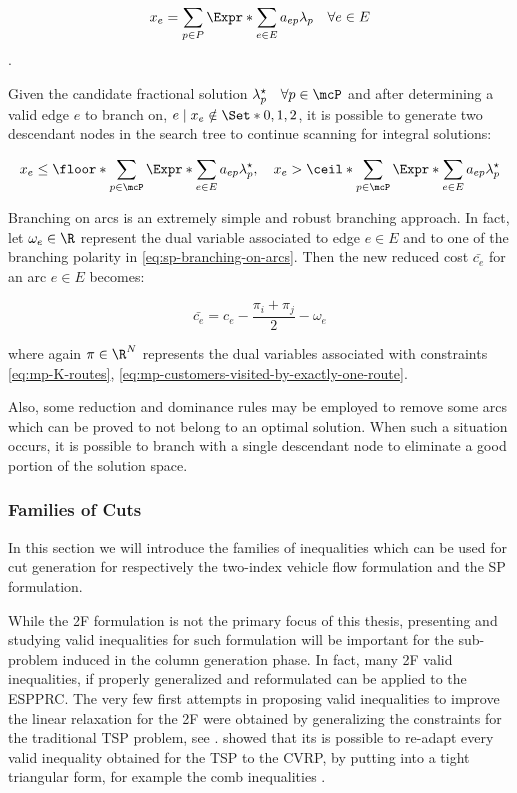 \begin{equation}
	x_e = \sum_{p \in P} \Expr*{\sum_{e \in E} a_{ep}} \lambda_p  \quad \forall e \in E
\end{equation}.

Given the candidate fractional solution $\lambda^\star_p \quad \forall p \in \mcP$
and after determining a valid edge $e$ to branch on, $e \mid x_e \notin \Set*{0, 1, 2}$,
it is possible to generate two descendant nodes in the search tree
to continue scanning for integral solutions:

\begin{equation}\label{eq:sp-branching-on-arcs}
	x_e \le \floor*{\sum_{p \in \mcP} \Expr*{\sum_{e \in E} a_{ep}} \lambda^\star_p}, \quad
	x_e > \ceil*{\sum_{p \in \mcP} \Expr*{\sum_{e \in E} a_{ep}} \lambda^\star_p}
\end{equation}


Branching on arcs is an extremely simple and robust branching approach.
In fact, let $\omega_e \in \R$ represent the dual variable associated to
edge $e \in E$ and to
one of the branching polarity in \cref{eq:sp-branching-on-arcs}.
Then the new reduced cost $\bar{c_e}$ for an arc $e \in E$ becomes:

\begin{equation}
	\bar{c_e} = c_e - \frac{\pi_i + \pi_j}{2} - \omega_e
\end{equation}

where again $\pi \in \R^N$ represents the dual variables associated with constraints \eqref{eq:mp-K-routes}, \eqref{eq:mp-customers-visited-by-exactly-one-route}.

Also, some reduction and dominance rules may be employed to remove some arcs
which can be proved to not belong to an optimal solution.
When such a situation occurs, it is possible to branch with a single descendant node to eliminate
a good portion of the solution space.


\subsubsection{Families of Cuts}
\label{sec:families-of-cuts}

In this section we will introduce the families of inequalities
which can be used for cut generation for respectively
the two-index vehicle flow formulation
and the SP formulation.


While the 2F formulation is not the primary focus of this thesis,
presenting and studying valid inequalities for such formulation
will be important for the sub-problem induced in the column generation phase.
In fact, many 2F valid inequalities, if properly generalized and reformulated
can be applied to the ESPPRC.
The very few first attempts in proposing valid inequalities
to improve the linear relaxation for the 2F were obtained by
generalizing the constraints for the traditional TSP problem, see \textcite{naddef1993}.
\citeauthor{naddef1993} showed that its is possible to re-adapt
every valid inequality obtained for the TSP to the CVRP,
by putting into a tight triangular form,
for example the comb inequalities \parencite{chvatal1973,grotschel1979,augerat1995a}.

